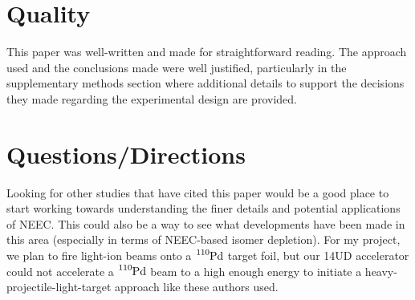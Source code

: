 \documentclass[12pt,a4paper]{article}
\begin{document}
\section*{Quality}
This paper was well-written and made for straightforward reading. The approach used and the conclusions made were well justified, particularly in the supplementary methods section where additional details to support the decisions they made regarding the experimental design are provided.


\section*{Questions/Directions}
Looking for other studies that have cited this paper
would be a good place to start working towards understanding the finer details and potential applications of NEEC. This could also be a way to see what developments have been made in this area (especially in terms of NEEC-based isomer depletion). For my project, we plan to fire light-ion beams onto a $\ce{^{110}Pd}$ target foil, but our 14UD accelerator could not accelerate a $\ce{^{110}Pd}$ beam to a high enough energy to initiate a heavy-projectile-light-target approach like these authors used.


%
\end{document}
